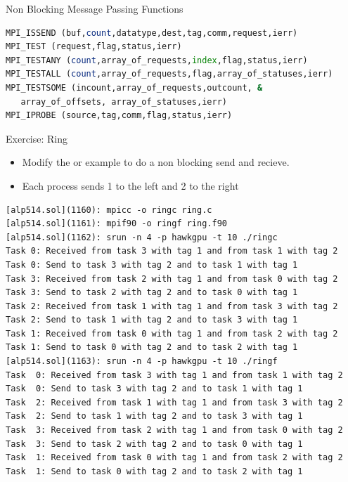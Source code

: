 \documentclass[10pt,t]{beamer}
\begin{document}
\begin{frame}{Non Blocking Message Passing Functions}
  \begin{lstlisting}[basicstyle=\scriptsize\ttfamily,language=Fortran]
MPI_ISSEND (buf,count,datatype,dest,tag,comm,request,ierr)
MPI_TEST (request,flag,status,ierr)
MPI_TESTANY (count,array_of_requests,index,flag,status,ierr)
MPI_TESTALL (count,array_of_requests,flag,array_of_statuses,ierr)
MPI_TESTSOME (incount,array_of_requests,outcount, &
   array_of_offsets, array_of_statuses,ierr)
MPI_IPROBE (source,tag,comm,flag,status,ierr)  
  \end{lstlisting}
\end{frame}

\begin{frame}{Exercise: Ring}
  \begin{itemize}
    \item Modify the  or  example to do a non blocking send and recieve.
    \item Each process sends 1 to the left and 2 to the right
  \end{itemize}
  \framebreak
  \begin{lstlisting}[basicstyle=\scriptsize\ttfamily]
[alp514.sol](1160): mpicc -o ringc ring.c
[alp514.sol](1161): mpif90 -o ringf ring.f90
[alp514.sol](1162): srun -n 4 -p hawkgpu -t 10 ./ringc
Task 0: Received from task 3 with tag 1 and from task 1 with tag 2
Task 0: Send to task 3 with tag 2 and to task 1 with tag 1
Task 3: Received from task 2 with tag 1 and from task 0 with tag 2
Task 3: Send to task 2 with tag 2 and to task 0 with tag 1
Task 2: Received from task 1 with tag 1 and from task 3 with tag 2
Task 2: Send to task 1 with tag 2 and to task 3 with tag 1
Task 1: Received from task 0 with tag 1 and from task 2 with tag 2
Task 1: Send to task 0 with tag 2 and to task 2 with tag 1
[alp514.sol](1163): srun -n 4 -p hawkgpu -t 10 ./ringf
Task  0: Received from task 3 with tag 1 and from task 1 with tag 2
Task  0: Send to task 3 with tag 2 and to task 1 with tag 1
Task  2: Received from task 1 with tag 1 and from task 3 with tag 2
Task  2: Send to task 1 with tag 2 and to task 3 with tag 1
Task  3: Received from task 2 with tag 1 and from task 0 with tag 2
Task  3: Send to task 2 with tag 2 and to task 0 with tag 1
Task  1: Received from task 0 with tag 1 and from task 2 with tag 2
Task  1: Send to task 0 with tag 2 and to task 2 with tag 1
  \end{lstlisting}
\end{frame}
\end{document}
